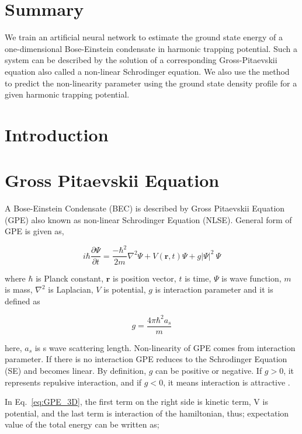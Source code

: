 \documentclass[a4paper,times,12pt]{article}
\begin{document}
\section*{Summary}

We train an artificial neural network to estimate the ground state energy
of a one-dimensional Bose-Einstein condensate in harmonic trapping potential.
Such a system can be described by the solution of a corresponding
Gross-Pitaevskii equation also called a non-linear Schrodinger equation.
We also use the method to predict the non-linearity parameter using the ground
state density profile for a given harmonic trapping potential.


\section{Introduction}



\section{Gross Pitaevskii Equation}

A Bose-Einstein Condensate (BEC) is described by Gross Pitaevskii Equation (GPE) also known as non-linear Schrodinger Equation (NLSE). General form of GPE is given as,

\begin{equation}
\label{eq:GPE_3D}
i \hbar \frac {\partial \Psi}{\partial t} = \frac {-\hbar^2}{2m}\nabla^2
\Psi + V(\boldsymbol{r}, t)\Psi + g|\Psi|^2\ \Psi
\end{equation}

\noindent where $\hbar$ is Planck constant, $\boldsymbol{r}$ is position vector, $t$ is time, $\Psi$ is wave function, $m$ is mass, $\nabla^2$ is Laplacian, $V$ is potential, $g$ is interaction parameter and it is defined as 

\begin{equation}
\label{eq:GPE_inter_param}
g=\frac{4\pi\hbar^2a_s}{m}
\end{equation}

\noindent here, $a_s$ is s wave scattering length. Non-linearity of GPE comes from interaction parameter. If there is no interaction GPE reduces to the Schrodinger Equation (SE) and becomes linear. By definition, $g$ can be positive or negative. If $g > 0$, it represents repulsive interaction, and if $g < 0$, it means interaction is attractive \cite{barenghi2016primer}.

In Eq.~\ref{eq:GPE_3D}, the first term on the right side is kinetic term, V is potential, and the last term is interaction of the hamiltonian, thus; expectation value of the total energy can be written as;
\end{document}
